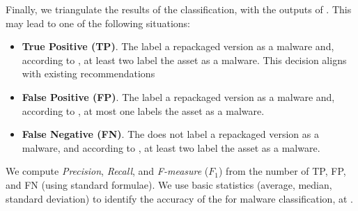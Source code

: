 Finally, we triangulate the results of the \ml classification, with the outputs of \vt. This may lead to one of the following situations:

\begin{itemize}
\item {\bf True Positive (TP)}. The \ml label a repackaged version as a malware and, according to
  \vt, at least two \ses label the asset as a malware. This decision aligns with existing recommendations~\cite{vt-label,DBLP:journals/ese/KhanmohammadiEH19}
   
\item {\bf False Positive (FP)}. The \ml label a repackaged version as a malware and, according to \vt, at most one \se labels the asset as a malware.

\item {\bf False Negative (FN)}. The \ml does not label a repackaged version as a malware, and according to \vt, at least two \ses label the asset as a malware.
\end{itemize}

We compute \emph{Precision}, \emph{Recall}, and \emph{F-measure} ($F_1$) from
the number of TP, FP, and FN (using standard
formulae). We use basic statistics (average, median, standard deviation) to identify the
accuracy of the \ml for malware classification, at \cds.
